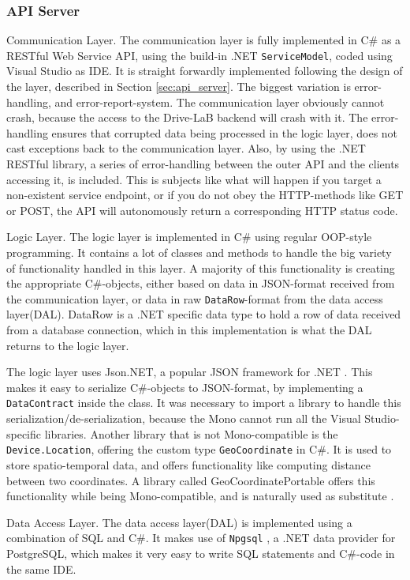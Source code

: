 \subsubsection{API Server}\label{subsec:impl_api_server}
Communication Layer.
The communication layer is fully implemented in C\# as a RESTful Web Service API, using the build-in .NET \texttt{ServiceModel}, coded using Visual Studio as IDE. It is straight forwardly implemented following the design of the layer, described in Section \ref{sec:api_server}. The biggest variation is error-handling, and error-report-system. The communication layer obviously cannot crash, because the access to the Drive-LaB backend will crash with it. The error-handling ensures that corrupted data being processed in the logic layer, does not cast exceptions back to the communication layer. Also, by using the .NET RESTful library, a series of error-handling between the outer API and the clients accessing it, is included. This is subjects like what will happen if you target a non-existent service endpoint, or if you do not obey the HTTP-methods like GET or POST, the API will autonomously return a corresponding HTTP status code.

Logic Layer.
The logic layer is implemented in C\# using regular OOP-style programming. It contains a lot of classes and methods to handle the big variety of functionality handled in this layer. A majority of this functionality is creating the appropriate C\#-objects, either based on data in JSON-format received from the communication layer, or data in raw \texttt{DataRow}-format from the data access layer(DAL). DataRow is a .NET specific data type to hold a row of data received from a database connection, which in this implementation is what the DAL returns to the logic layer.  

The logic layer uses Json.NET, a popular JSON framework for .NET \citep{json_dot_net}. This makes it easy to serialize C\#-objects to JSON-format, by implementing a \texttt{DataContract} inside the class. It was necessary to import a library to handle this serialization/de-serialization, because the Mono cannot run all the Visual Studio-specific libraries. Another library that is not Mono-compatible is the \texttt{Device.Location}, offering the custom type \texttt{GeoCoordinate} in C\#. It is used to store spatio-temporal data, and offers functionality like computing distance between two coordinates. A library called GeoCoordinatePortable offers this functionality while being Mono-compatible, and is naturally used as substitute \citep{geocoordinateportable}.

Data Access Layer.
The data access layer(DAL) is implemented using a combination of SQL and C\#. It makes use of \texttt{Npgsql} \citep{npgsql}, a .NET data provider for PostgreSQL, which makes it very easy to write SQL statements and C\#-code in the same IDE. 